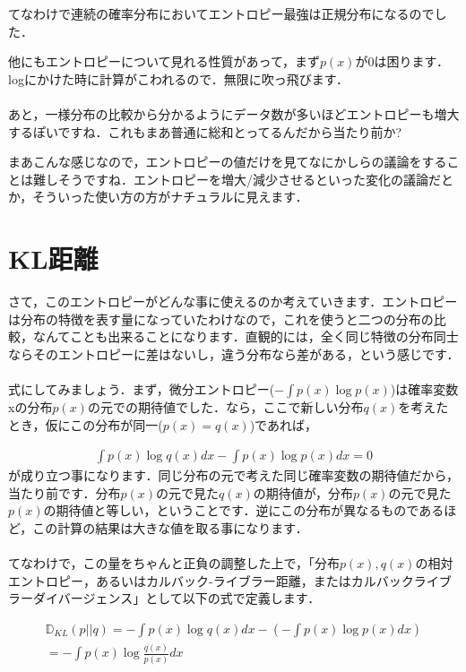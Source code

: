 \documentclass[11pt,a4paper,dvipdfmx]{ujreport}
\begin{document}
てなわけで連続の確率分布においてエントロピー最強は正規分布になるのでした．

他にもエントロピーについて見れる性質があって，まず$p(x)$が0は困ります．logにかけた時に計算がこわれるので．無限に吹っ飛びます．\\
\\

あと，一様分布の比較から分かるようにデータ数が多いほどエントロピーも増大するぽいですね．これもまあ普通に総和とってるんだから当たり前か?

まあこんな感じなので，エントロピーの値だけを見てなにかしらの議論をすることは難しそうですね．エントロピーを増大/減少させるといった変化の議論だとか，そういった使い方の方がナチュラルに見えます．

\section{KL距離}
さて，このエントロピーがどんな事に使えるのか考えていきます．エントロピーは分布の特徴を表す量になっていたわけなので，これを使うと二つの分布の比較，なんてことも出来ることになります．直観的には，全く同じ特徴の分布同士ならそのエントロピーに差はないし，違う分布なら差がある，という感じです．\\
\\

式にしてみましょう．まず，微分エントロピー($- \int p(x) \log p(x)$)は確率変数xの分布$p(x)$の元での期待値でした．なら，ここで新しい分布$q(x)$を考えたとき，仮にこの分布が同一($p(x) = q(x)$)であれば，

\begin{eqnarray}
\label{eq:KL1}
  \int p(x) \log q(x)dx - \int p(x) \log p(x)dx= 0
\end{eqnarray}
が成り立つ事になります．同じ分布の元で考えた同じ確率変数の期待値だから，当たり前です．分布$p(x)$の元で見た$q(x)$の期待値が，分布$p(x)$の元で見た$p(x)$の期待値と等しい，ということです．逆にこの分布が異なるものであるほど，この計算の結果は大きな値を取る事になります．\\
\\

てなわけで，この量をちゃんと正負の調整した上で，「分布$p(x), q(x)$の相対エントロピー，あるいはカルバック-ライブラー距離，またはカルバックライブラーダイバージェンス」として以下の式で定義します\cite{prml}．

\begin{eqnarray}
\label{eq:KLD}
  \mathbb{D}_{KL}(p||q) = - \int p(x) \log q(x)dx - (-\int p(x) \log p(x)dx)\\
  = -\int p(x) \log \frac{q(x)}{p(x)} dx
\end{eqnarray}
\end{document}
